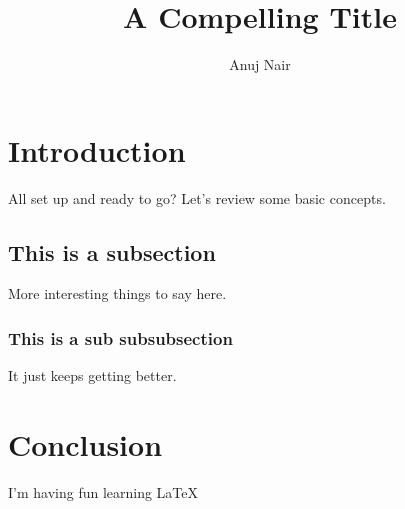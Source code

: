 \documentclass{article}
\title{A Compelling Title}
\author{Anuj Nair}
\begin{document}
\maketitle

\section{Introduction}

All set up and ready to go? Let's review some basic concepts.

\subsection{This is a subsection}

More interesting things to say here.

\subsubsection{This is a sub subsubsection}

It just keeps getting better.

\section{Conclusion}

I'm having fun learning \LaTeX
\end{document}
